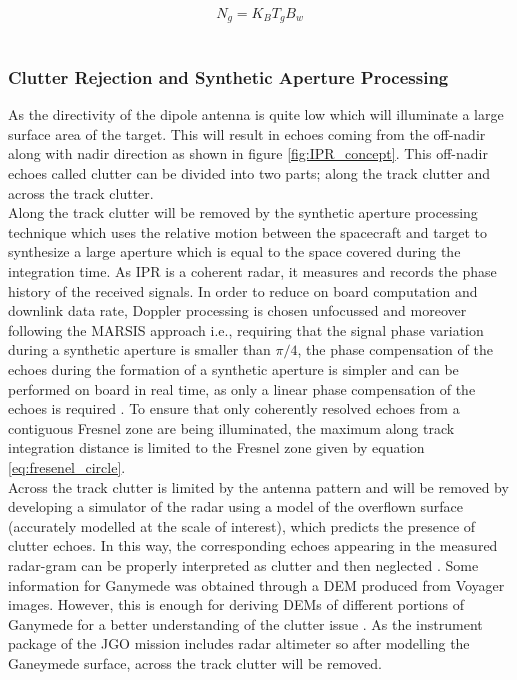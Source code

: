 \begin{equation}
N_{g} = K_{B}T_{g}B_{w}
\label{eq:galactic_noise}
\end{equation}
\\


\subsubsection{Clutter Rejection and Synthetic Aperture Processing}
As the directivity of the dipole antenna is quite low which will illuminate a large surface area of the target. This will result in echoes coming from the off-nadir along with nadir direction as shown in figure \ref{fig:IPR_concept}. This off-nadir echoes called clutter can be divided into two parts; along the track clutter and across the track clutter.\\
%
Along the track clutter will be removed by the synthetic aperture processing technique which uses the relative motion between the spacecraft and target to synthesize a large aperture which is equal to the space covered during the integration time. As \ac{IPR} is a coherent radar, it measures and records the phase history of the received signals. In order to reduce on board computation and downlink data rate, Doppler processing is chosen unfocussed and moreover following the \ac{MARSIS} approach i.e., requiring that the signal phase variation during a synthetic aperture is smaller than $\pi/4$, the phase compensation of the echoes during the formation of a synthetic aperture is simpler and can be performed on board in real time, as only a linear phase compensation of the echoes is required \cite{Gany_SRS}. To ensure that only coherently resolved echoes from a contiguous Fresnel zone are being illuminated, the maximum along track integration distance is limited to the Fresnel zone given by equation \ref{eq:fresenel_circle}.
\\
Across the track clutter is limited by the antenna pattern and will be removed by developing a simulator of the radar using a model of the overflown surface (accurately modelled at the scale of interest), which predicts the presence of clutter echoes. In this way, the corresponding echoes appearing in the measured radar-gram can be properly interpreted as clutter and then neglected \cite{SHARAD}. Some information for Ganymede was obtained through a \ac{DEM} produced from Voyager images. However, this is enough  for deriving \acp{DEM} of different portions of Ganymede for a better understanding of the clutter issue \cite{Gany_SRS}. As the instrument package of the \ac{JGO} mission includes radar altimeter so after modelling the Ganeymede surface, across the track clutter will be removed.
